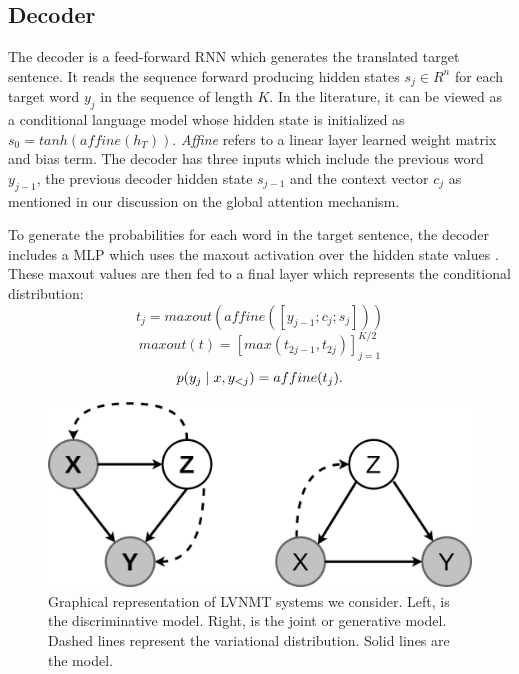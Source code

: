  




\subsection{Decoder}


The decoder is a feed-forward \ac{RNN} which generates the translated target sentence. It reads the sequence forward producing hidden states $s_{j} \in R^{n}$ for each target word $y_{j}$ in the sequence of length $K$. In the literature, it can be viewed as a conditional language model \cite{koehn2017NMT} whose hidden state is initialized as $s_{0} = tanh(affine(h_{T}))$. \textit{Affine} refers to a linear layer learned weight matrix and bias term. The decoder has three inputs which include the previous word $y_{j-1}$, the previous decoder hidden state $s_{j-1}$ and the context vector $c_{j}$ as mentioned in our discussion on the global attention mechanism. 


To generate the probabilities for each word in the target sentence, the decoder includes a \ac{MLP} which uses the maxout activation over the hidden state values \cite{goodfellow2013maxout}. These maxout values are then fed to a final layer which represents the conditional distribution:
\begin{equation}
	t_{j} = maxout(affine([y_{j-1}; c_{j}; s_{j} ]))
\end{equation}
\begin{equation}
	maxout(t) = [max(t_{2j -1}, t_{2j})]_{j=1}^{K / 2}
\end{equation}
\begin{equation}
p(y_{j} \; | \;{x, y_{<j}}) = affine(t_{j}).
\end{equation}


\begin{figure}
	\includegraphics[width=\linewidth]{PGMofModels.png}
	\caption{Graphical representation of \ac{LVNMT} systems we consider. Left, is the discriminative model. Right, is the joint or generative model. Dashed lines represent the variational distribution. Solid lines are the model.}
	\label{fig:graphicalmodel}
\end{figure}


